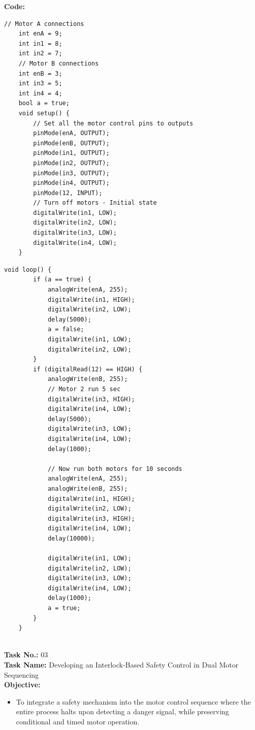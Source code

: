 \documentclass[a4paper,12pt]{article}
\begin{document}
	
	
	\textbf{	Code:}
\begin{lstlisting}[style=courier10, caption={Task 2 Arduino code}]
	// Motor A connections
	int enA = 9;
	int in1 = 8;
	int in2 = 7;
	// Motor B connections
	int enB = 3;
	int in3 = 5;
	int in4 = 4;
	bool a = true;
	void setup() {
		// Set all the motor control pins to outputs
		pinMode(enA, OUTPUT);
		pinMode(enB, OUTPUT);
		pinMode(in1, OUTPUT);
		pinMode(in2, OUTPUT);
		pinMode(in3, OUTPUT);
		pinMode(in4, OUTPUT);
		pinMode(12, INPUT);
		// Turn off motors - Initial state
		digitalWrite(in1, LOW);
		digitalWrite(in2, LOW);
		digitalWrite(in3, LOW);
		digitalWrite(in4, LOW);
	}
		\end{lstlisting}
	
	\begin{lstlisting}[style=courier10, caption={Task 2 Arduino code}]
	void loop() {
		if (a == true) {
			analogWrite(enA, 255);
			digitalWrite(in1, HIGH);
			digitalWrite(in2, LOW);
			delay(5000);
			a = false;
			digitalWrite(in1, LOW);
			digitalWrite(in2, LOW);
		}
		if (digitalRead(12) == HIGH) {
			analogWrite(enB, 255);
			// Motor 2 run 5 sec
			digitalWrite(in3, HIGH);
			digitalWrite(in4, LOW);
			delay(5000);
			digitalWrite(in3, LOW);
			digitalWrite(in4, LOW);
			delay(1000);
	
			// Now run both motors for 10 seconds
			analogWrite(enA, 255);
			analogWrite(enB, 255);
			digitalWrite(in1, HIGH);
			digitalWrite(in2, LOW);
			digitalWrite(in3, HIGH);
			digitalWrite(in4, LOW);
			delay(10000);
			
			digitalWrite(in1, LOW);
			digitalWrite(in2, LOW);
			digitalWrite(in3, LOW);
			digitalWrite(in4, LOW);
			delay(1000);
			a = true;
		}
	}
	
\end{lstlisting}

	
	\textbf{	Task No.:} 03 \\
	\textbf{	Task Name:} Developing an Interlock-Based Safety Control in Dual Motor Sequencing\\
	
	\textbf{Objective:}
	
	
	\begin{itemize}
		\item To integrate a safety mechanism into the motor control sequence where the entire process
		halts upon detecting a danger signal, while preserving conditional and timed motor
		operation.
	\end{itemize}
	
\end{document}
